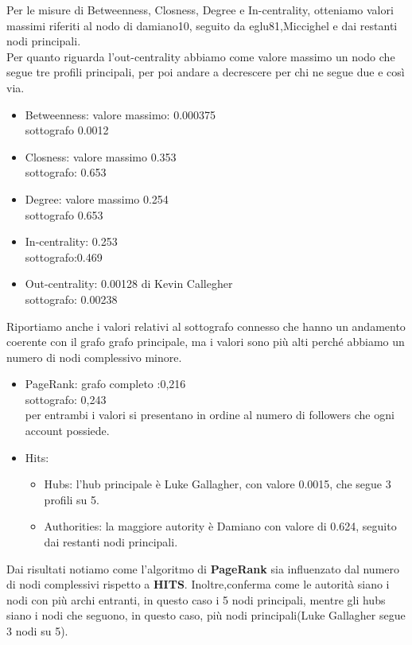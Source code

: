 \documentclass[a4paper,11pt]{report}
\begin{document}
Per le misure di Betweenness, Closness, Degree e In-centrality, otteniamo  valori massimi riferiti al nodo di damiano10, seguito da eglu81,Miccighel e dai restanti nodi principali.\\Per quanto riguarda l'out-centrality abbiamo come valore massimo un nodo che segue tre profili principali, per poi andare a decrescere per chi ne segue due e così via.
		\begin{itemize}
			\item Betweenness: valore massimo: 0.000375 \\sottografo 0.0012 
			\item Closness: valore massimo 0.353 
			\\sottografo: 0.653
			\item Degree: valore massimo 0.254 
			\\sottografo 0.653
			\item In-centrality: 0.253 \\sottografo:0.469
			\item Out-centrality: 0.00128 di Kevin Callegher \\sottografo: 0.00238 
		\end{itemize}
	Riportiamo anche i valori relativi al sottografo connesso che hanno un andamento coerente con il grafo grafo principale, ma i valori sono più alti perché abbiamo un numero di nodi complessivo minore.
		\begin{itemize}
			\item PageRank: grafo completo :0,216\\  
			sottografo: 0,243 \\per entrambi i valori si presentano in ordine al numero di followers che ogni account possiede.
			\item Hits: 
				\begin{itemize}
					\item Hubs: l'hub principale è Luke Gallagher, con valore 0.0015, che segue 3 profili su 5.
					\item Authorities: la maggiore autority è Damiano con valore di 0.624, seguito dai restanti nodi principali.
			\end{itemize}
		\end{itemize}
	Dai risultati notiamo come l'algoritmo di \textbf{PageRank} sia influenzato dal numero di nodi complessivi rispetto a \textbf{HITS}. Inoltre,conferma come le autorità siano i nodi con più archi entranti, in questo caso i 5 nodi principali, mentre gli hubs siano i nodi che seguono, in questo caso, più nodi principali(Luke Gallagher segue 3 nodi su 5).
\end{document}
